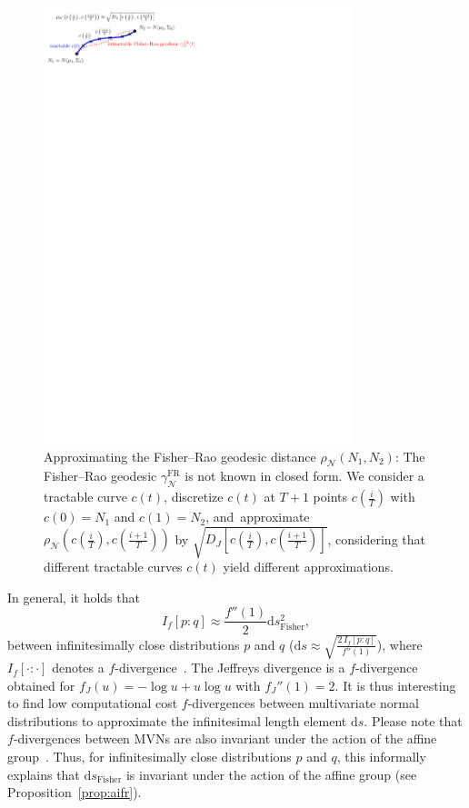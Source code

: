\documentclass[entropy,article,accept,oneauthor,pdftex,entropy]{Definitions/mdpi}
\def\Fisher{\mathrm{Fisher}}
\def\calN{\mathcal{N}}
\def\ds{\mathrm{d}s}
\begin{document}
\begin{figure}[H]

\includegraphics[width=0.8\textwidth]{FigIpe-ApproximationTractableCurve.pdf}
%
\caption{Approximating the Fisher–Rao geodesic distance $\rho_\calN(N_1,N_2)$: 
The Fisher–Rao geodesic $\gamma_\calN^{\mathrm{FR}}$ is not known in closed form.
 We consider a tractable curve $c(t)$, discretize $c(t)$ at $T+1$ points $c(\frac{i}{T})$ with $c(0)=N_1$ and $c(1)=N_2$, and~approximate $\rho_\calN\left(c\left(\frac{i}{T}\right),c\left(\frac{i+1}{T}\right)\right)$ by $\sqrt{D_J\left[c\left(\frac{i}{T}\right),c\left(\frac{i+1}{T}\right)\right]}$, considering that different tractable curves $c(t)$ yield different approximations.
 \label{fig:method}}
\end{figure}



In general, it holds that 
$$
I_f[p:q]\approx \frac{f''(1)}{2}\ds^2_\Fisher,
$$ 
between infinitesimally close distributions $p$ and $q$ ($\ds\approx \sqrt{\frac{2\,I_f[p:q]}{f''(1)}}$), where $I_f[\cdot:\cdot]$ denotes a $f$-divergence~\cite{IG-2016}.
The Jeffreys divergence is a $f$-divergence obtained for $f_J(u)=-\log u+u\log u$ with $f_J''(1)=2$.
It is thus interesting to find low computational cost $f$-divergences between multivariate normal distributions to approximate the infinitesimal length element $\ds$. 
Please note that $f$-divergences between MVNs are also invariant under the action of the affine group~\cite{nielsen2022note}.
Thus, for infinitesimally close distributions $p$ and $q$, this informally explains that $\ds_\Fisher$ is invariant under the action of the affine group (see Proposition~\ref{prop:aifr}).
\end{document}
